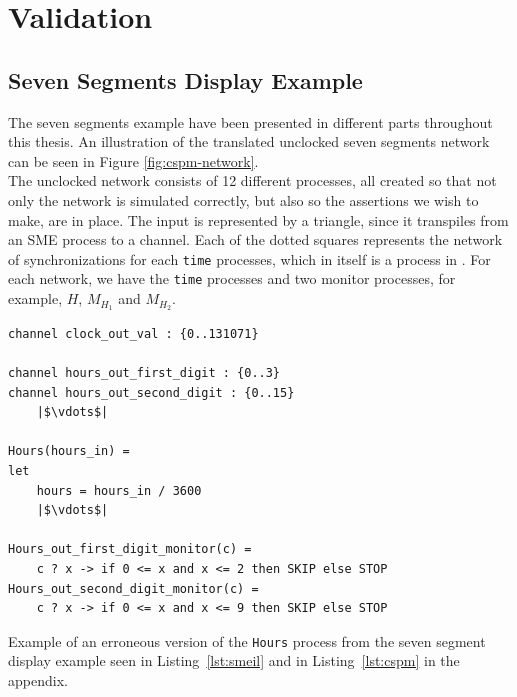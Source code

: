 

\section{Validation}

\subsection{Seven Segments Display Example}
The seven segments example have been presented in different parts throughout this thesis. An illustration of the translated unclocked seven segments network can be seen in Figure \ref{fig:cspm-network}.\\

The unclocked \cspm{} network consists of 12 different processes, all created so that not only the network is simulated correctly, but also so the assertions we wish to make, are in place. The input is represented by a triangle, since it transpiles from an SME process to a \cspm{} channel. Each of the dotted squares represents the network of synchronizations for each \texttt{time} processes, which in itself is a process in \cspm{}. For each network, we have the \texttt{time} processes and two monitor processes, for example, $H$, $M_{H_1}$ and $M_{H_2}$.
\\

\begin{listing}
\begin{verbatim}
channel clock_out_val : {0..131071}

channel hours_out_first_digit : {0..3}
channel hours_out_second_digit : {0..15}
    |$\vdots$|

Hours(hours_in) =
let
    hours = hours_in / 3600
    |$\vdots$|

Hours_out_first_digit_monitor(c) =
    c ? x -> if 0 <= x and x <= 2 then SKIP else STOP
Hours_out_second_digit_monitor(c) =
    c ? x -> if 0 <= x and x <= 9 then SKIP else STOP

\end{verbatim}
\caption{Example of an erroneous version of the \texttt{Hours} process from the \cspm{} seven segment display example seen in Listing~\ref{lst:smeil} and in Listing~\ref{lst:cspm} in the appendix.}
\label{lst:cspm_error}
\end{listing}

